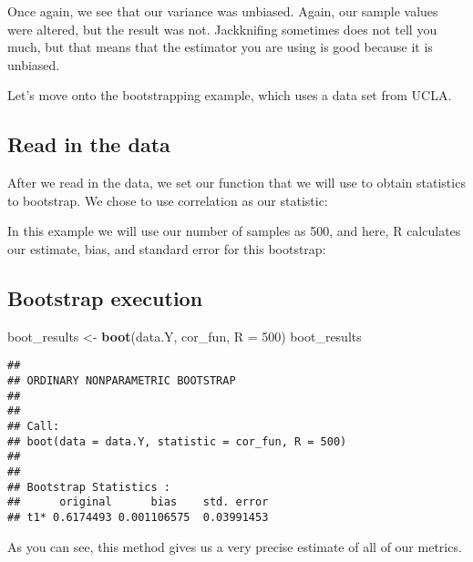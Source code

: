 \documentclass[
]{article}
\newenvironment{Shaded}{\begin{snugshade}}{\end{snugshade}}
\newcommand{\AttributeTok}[1]{\textcolor[rgb]{0.13,0.29,0.53}{#1}}
\newcommand{\ControlFlowTok}[1]{\textcolor[rgb]{0.13,0.29,0.53}{\textbf{#1}}}
\newcommand{\DecValTok}[1]{\textcolor[rgb]{0.00,0.00,0.81}{#1}}
\newcommand{\FunctionTok}[1]{\textcolor[rgb]{0.13,0.29,0.53}{\textbf{#1}}}
\newcommand{\NormalTok}[1]{#1}
\newcommand{\OtherTok}[1]{\textcolor[rgb]{0.56,0.35,0.01}{#1}}
\newcommand{\SpecialCharTok}[1]{\textcolor[rgb]{0.81,0.36,0.00}{\textbf{#1}}}
\begin{document}
Once again, we see that our variance was unbiased. Again, our sample
values were altered, but the result was not. Jackknifing sometimes does
not tell you much, but that means that the estimator you are using is
good because it is unbiased.

Let's move onto the bootstrapping example, which uses a data set from
UCLA.

\subsection{Read in the data}\label{read-in-the-data}

After we read in the data, we set our function that we will use to
obtain statistics to bootstrap. We chose to use correlation as our
statistic:

\begin{Shaded}
\end{Shaded}

In this example we will use our number of samples as 500, and here, R
calculates our estimate, bias, and standard error for this bootstrap:

\subsection{Bootstrap execution}\label{bootstrap-execution}

\begin{Shaded}
\begin{Highlighting}[]
\NormalTok{boot\_results }\OtherTok{\textless{}{-}} \FunctionTok{boot}\NormalTok{(data.Y, cor\_fun, }\AttributeTok{R =} \DecValTok{500}\NormalTok{)}
\NormalTok{boot\_results}
\end{Highlighting}
\end{Shaded}

\begin{verbatim}
## 
## ORDINARY NONPARAMETRIC BOOTSTRAP
## 
## 
## Call:
## boot(data = data.Y, statistic = cor_fun, R = 500)
## 
## 
## Bootstrap Statistics :
##      original      bias    std. error
## t1* 0.6174493 0.001106575  0.03991453
\end{verbatim}

As you can see, this method gives us a very precise estimate of all of
our metrics.
\end{document}
